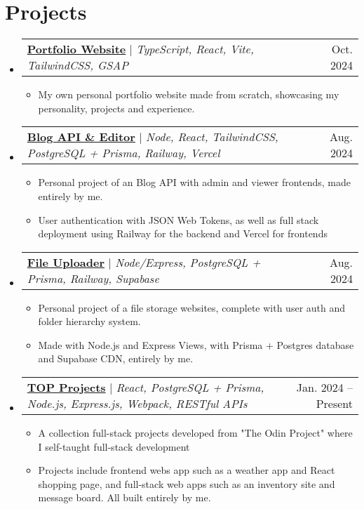 \documentclass[letterpaper,11pt]{article}
\makeatletter
\newcommand{\resumeItem}[1]{
  \item\small{
    {#1 \vspace{-2pt}}
  }
}
\newcommand{\resumeProjectHeading}[2]{
    \item
    \begin{tabular*}{0.97\textwidth}{l@{\extracolsep{\fill}}r}
      \small#1 & #2 \\
    \end{tabular*}\vspace{-7pt}
}
\newcommand{\resumeSubHeadingListStart}{\begin{itemize}[leftmargin=0.15in, label={}]}
\newcommand{\resumeSubHeadingListEnd}{\end{itemize}}
\newcommand{\resumeItemListStart}{\begin{itemize}}
\newcommand{\resumeItemListEnd}{\end{itemize}\vspace{-5pt}}
\makeatother
\begin{document}
\section{Projects}
    \resumeSubHeadingListStart
      \resumeProjectHeading
        {\textbf{\href{https://edgr.live}{Portfolio Website}} $|$ \emph{TypeScript, React, Vite, TailwindCSS, GSAP}}{Oct. 2024}
          \resumeItemListStart
          \resumeItem{My own personal portfolio website made from scratch, showcasing my personality, projects and experience.}
          \resumeItemListEnd
      \resumeProjectHeading
        {\textbf{\href{https://edgr-odin-blog-access.vercel.app/}{Blog API \& Editor}} $|$ \emph{Node, React, TailwindCSS, PostgreSQL + Prisma, Railway, Vercel}}{Aug. 2024}
          \resumeItemListStart
            \resumeItem{Personal project of an Blog API with admin and viewer frontends, made entirely by me.}
            \resumeItem{User authentication with JSON Web Tokens, as well as full stack deployment using Railway for the backend and Vercel for frontends}
          \resumeItemListEnd
        \resumeProjectHeading
      {\textbf{\href{https://odin-file-uploader-production-11ed.up.railway.app/}{File Uploader}} $|$ \emph{Node/Express, PostgreSQL + Prisma, Railway, Supabase}}{Aug. 2024}
        \resumeItemListStart
          \resumeItem{Personal project of a file storage websites, complete with user auth and folder hierarchy system.}
          \resumeItem{Made with Node.js and Express Views, with Prisma + Postgres database and Supabase CDN, entirely by me.}
        \resumeItemListEnd
        \resumeProjectHeading
        {\textbf{\href{https://safarinexus.github.io/odin_projects/}{TOP Projects}} $|$ \emph{React, PostgreSQL + Prisma, Node.js, Express.js, Webpack, RESTful APIs}}{Jan. 2024 -- Present}
          \resumeItemListStart
          \resumeItem{A collection full-stack projects developed from "The Odin Project" where I self-taught full-stack development}
          \resumeItem{Projects include frontend webs app such as a weather app and React shopping page, and full-stack web apps such as an inventory site and message board. All built entirely by me.}
          \resumeItemListEnd
    \resumeSubHeadingListEnd



%
\end{document}
